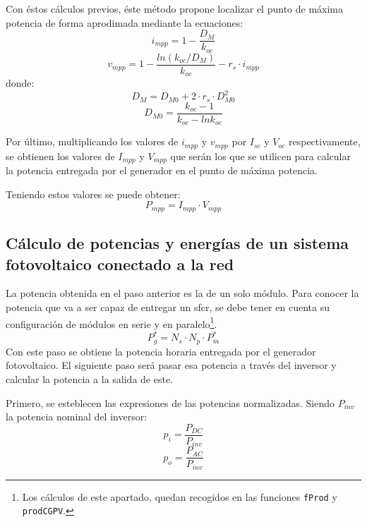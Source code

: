 Con éstos cálculos previos, éste método propone localizar el punto de máxima potencia de forma aprodimada mediante la ecuaciones:
\begin{equation}
i_{mpp}=1-\frac{D_M}{k_{oc}}
\end{equation}
\begin{equation}
v_{mpp}=1-\frac{ln(k_{oc}/D_M)}{k_{oc}}-r_s\cdot i_{mpp}
\end{equation}
donde:
\begin{equation}
D_M=D_{M0}+2\cdot r_s\cdot D_{M0}^2
\end{equation}
\begin{equation}
D_{M0}=\frac{k_{oc}-1}{k_{oc}-lnk_{oc}}
\end{equation}

Por último, multiplicando los valores de \(i_{mpp}\) y \(v_{mpp}\) por \(I_{sc}\) y \(V_{oc}\) respectivamente, se obtienen los valores de \(I_{mpp}\) y \(V_{mpp}\) que serán los que se utilicen para calcular la potencia entregada por el generador en el punto de máxima potencia.

Teniendo estos valores se puede obtener:
\begin{equation}
P_{mpp}=I_{mpp}\cdot V_{mpp}
\end{equation}

\subsection{Cálculo de potencias y energías de un sistema fotovoltaico conectado a la red}
\label{sec:org8fe76e6}
\label{subsec:calculo-potencias-energias}
La potencia obtenida en el paso anterior es la de un solo módulo. Para conocer la potencia que va a ser capaz de entregar un sfcr, se debe tener en cuenta su configuración de módulos en serie y en paralelo\footnote{Los cálculos de este apartado, quedan recogidos en las funciones \texttt{fProd} y \texttt{prodCGPV}.}.
\begin{equation}
P_g^*=N_s\cdot N_p\cdot P_m^*
\end{equation}
Con este paso se obtiene la potencia horaria entregada por el generador fotovoltaico. El siguiente paso será pasar esa potencia a través del inversor y calcular la potencia a la salida de este.

Primero, se esteblecen las expresiones de las potencias normalizadas. Siendo \(P_{inv}\) la potencia nominal del inversor:
\begin{equation}
p_i=\frac{P_{DC}}{P_{inv}}
\end{equation}
\begin{equation}
p_o=\frac{P_{AC}}{P_{inv}}
\end{equation}

